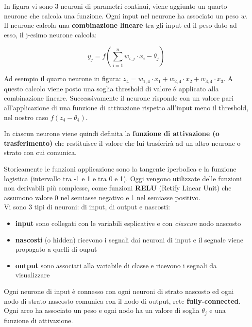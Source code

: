 In figura vi sono 3 neuroni di parametri continui, viene aggiunto un quarto neurone che calcola una funzione. Ogni input nel neurone ha associato un peso $w$.
Il neurone calcola una \textbf{combinazione lineare} tra gli input ed il peso dato ad esso, il j-esimo neurone calcola: 

\[ y_j = f(\sum_{i=1}^{n} w_{i,j} \cdot x_i - \theta_j)\] 

Ad esempio il quarto neurone in figura:  $z_4 = w_{1,4} \cdot x_1 + w_{2,4} \cdot x_2 +w_{3,4} \cdot x_3$.
A questo calcolo viene posto una soglia threshold di valore
$\theta$ applicato alla combinazione lineare. Successivamente il neurone risponde con un valore pari all'applicazione di una funzione di attivazione rispetto all'input meno il threshold, 
nel nostro caso $f(z_4-\theta_4)$. 

\begin{defn}
	In ciascun neurone viene quindi definita la \textbf{funzione di attivazione (o trasferimento)} che restituisce il valore che lui trasferir\`a ad un altro neurone o strato con cui comunica. 
\end{defn}Storicamente le funzioni applicazione sono la tangente iperbolica e la funzione logistica (intervallo tra -1 e 1 e tra 0 e 1). Oggi vengono utilizzate delle funzioni non derivabili pi\`u complesse, come funzioni \textbf{RELU} (Retify Linear Unit) che assumono valore 0 nel semiasse negativo e 1 nel semiasse positivo.
\\

Vi sono 3 tipi di neuroni: di input, di output e nascosti:
\begin{itemize}
	\item \textbf{input} sono collegati con le variabili esplicative e con \textit{ciascun} nodo nascosto
	\item \textbf{nascosti} (o hidden) ricevono i segnali dai neuroni di input e il segnale viene propagato a quelli di ouput
	\item \textbf{output} sono associati alla variabile di classe e ricevono i segnali da visualizzare
\end{itemize}

Ogni neurone di input \`e connesso con ogni neuroni di strato nascosto  ed ogni nodo di strato nascosto comunica con il nodo di output, rete \textbf{fully-connected}. Ogni arco ha associato un peso e ogni nodo ha un valore di soglia $\theta_j$ e una funzione di attivazione. 

